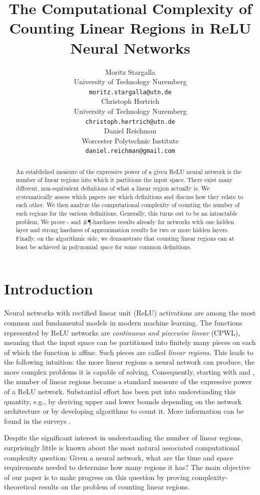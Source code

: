\documentclass{article}
\title{The Computational Complexity of Counting Linear Regions in ReLU Neural Networks}
\author{
  Moritz Stargalla \\
  University of Technology Nuremberg \\
  \texttt{moritz.stargalla@utn.de} \\
  \And
  Christoph Hertrich \\
  University of Technology Nuremberg \\
  \texttt{christoph.hertrich@utn.de} \\
  \And
  Daniel Reichman \\
  Worcester Polytechnic Institute \\
  \texttt{daniel.reichman@gmail.com}
}
\begin{document}
\maketitle


\begin{abstract}
  An established measure of the expressive power of a given ReLU neural network is the number of linear regions into which it partitions the input space.
  There exist many different, non-equivalent definitions of what a linear region actually is. We systematically assess which papers use which definitions and discuss how they relate to each other. We then analyze the computational complexity of counting the number of such regions for the various definitions. Generally, this turns out to be an intractable problem. We prove \NP{}- and \#\P{}-hardness results already for networks with one hidden layer and strong hardness of approximation results for two or more hidden layers. Finally, on the algorithmic side, we demonstrate that counting linear regions can at least be achieved in polynomial \emph{space} for some common definitions.
\end{abstract}


\section{Introduction}

Neural networks with rectified linear unit (ReLU) activations are among the most common and fundamental models in modern machine learning. The functions represented by ReLU networks are \emph{continuous and piecewise linear} (CPWL), meaning that the input space can be partitioned into finitely many pieces on each of which the function is affine. Such pieces are called \emph{linear regions}. This leads to the following intuition: the more linear regions a neural network can produce, the more complex problems it is capable of solving. Consequently, starting with \citet{pascanu2013number} and \citet{montufar2014number}, the number of linear regions became a standard measure of the expressive power of a ReLU network. Substantial effort has been put into understanding this quantity, e.g., by deriving upper and lower bounds depending on the network architecture or by developing algorithms to count it. More information can be found in the surveys \citet{huchette2023deep,balestriero2025geometry}.

Despite the significant interest in understanding the number of linear regions, surprisingly little is known about the most natural associated computational complexity question: Given a neural network,
what are the time and space requirements needed to determine how many regions it has? The main objective of our paper is to make progress on this question by proving 
complexity-theoretical results on the problem of counting linear regions.
\end{document}
